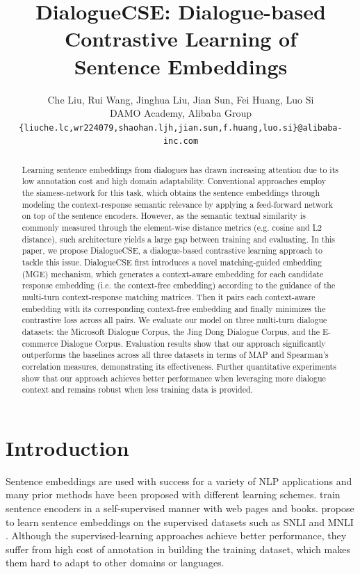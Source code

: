 \documentclass[11pt]{article}
\title{DialogueCSE: Dialogue-based Contrastive Learning of\\Sentence Embeddings}
\author{
    Che Liu, Rui Wang, Jinghua Liu, Jian Sun, Fei Huang, Luo Si \\
    DAMO Academy, Alibaba Group \\
    \texttt{\{liuche.lc,wr224079,shaohan.ljh,jian.sun,f.huang,luo.si\}@alibaba-inc.com} \\
}
\begin{document}
\maketitle

\begin{abstract}
Learning sentence embeddings from dialogues has drawn increasing attention due to its low annotation cost and high domain adaptability.
Conventional approaches employ the siamese-network for this task, which obtains the sentence embeddings through modeling the context-response semantic relevance by applying a feed-forward network on top of the sentence encoders.
However, as the semantic textual similarity is commonly measured through the element-wise distance metrics (e.g. cosine and L2 distance), such architecture yields a large gap between training and evaluating.
In this paper, we propose DialogueCSE, a dialogue-based contrastive learning approach to tackle this issue.
DialogueCSE first introduces a novel matching-guided embedding (MGE) mechanism, which generates a context-aware embedding for each candidate response embedding (i.e. the context-free embedding) according to the guidance of the multi-turn context-response matching matrices.
Then it pairs each context-aware embedding with its corresponding context-free embedding and finally minimizes the contrastive loss across all pairs.
We evaluate our model on three multi-turn dialogue datasets: the Microsoft Dialogue Corpus, the Jing Dong Dialogue Corpus, and the E-commerce Dialogue Corpus.
Evaluation results show that our approach significantly outperforms the baselines across all three datasets in terms of MAP and Spearman's correlation measures, demonstrating its effectiveness.
Further quantitative experiments show that our approach achieves better performance when leveraging more dialogue context and remains robust when less training data is provided.
\end{abstract}

\section{Introduction}
Sentence embeddings are used with success for a variety of NLP applications \cite{use} and many prior methods have been proposed with different learning schemes.
\citet{skip_thought, quick_thought, fast_sent} train sentence encoders in a self-supervised manner with web pages and books.
\citet{infer_sent, use, sent_bert} propose to learn sentence embeddings on the supervised datasets such as SNLI \cite{snli} and MNLI \cite{mnli}.
Although the supervised-learning approaches achieve better performance, they suffer from high cost of annotation in building the training dataset, which makes them hard to adapt to other domains or languages.
\end{document}
